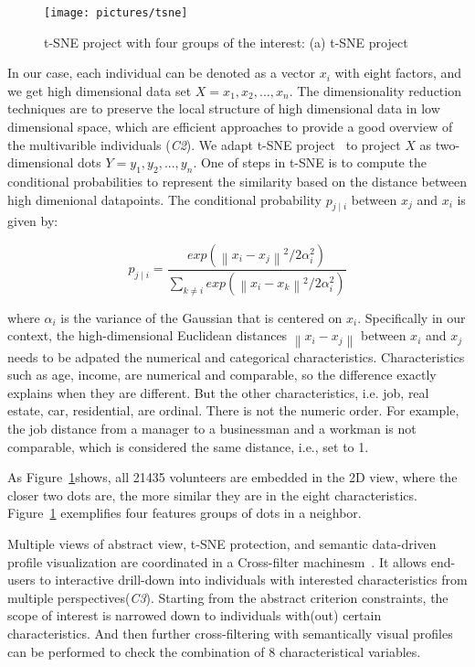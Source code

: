 \begin{figure}[htb!]
 \centering %
 \texttt{[image: pictures/tsne]}
 \caption{t-SNE project with four groups of the interest: (a) t-SNE project }
 \label{fig:tsne}
\end{figure}

In our case, each individual can be denoted as a vector $x_i$ with eight factors, and we get high dimensional data set $X={x_1, x_2, ..., x_n}$. The dimensionality reduction techniques are to preserve the local structure of high dimensional data in low dimensional space, which are efficient approaches to provide a good overview of the multivarible individuals (\textit{C2}). We adapt t-SNE project~\citep{maaten2008visualizing} to project $X$ as two-dimensional dots $Y={y_1, y_2, ..., y_n}$. One of steps in t-SNE is to compute the conditional probabilities to represent the similarity based on the distance between high dimenional datapoints. The conditional probability $p_{j\mid i}$ between $x_j$ and $x_i$ is given by:

\begin{equation}
p_{j\mid i} = \frac{exp({\left \| x_i - x_j \right \|}^2/2\alpha_i ^{2})}{\sum _{k\neq i}exp({\left \| x_i - x_k \right \|}^2/2\alpha_i ^{2})}
\end{equation}

where $\alpha_i$ is the variance of the Gaussian that is centered on $x_i$. Specifically in our context, the high-dimensional Euclidean distances $\left \| x_i - x_j \right \|$ between $x_i$ and $x_j$ needs to be adpated the numerical and categorical characteristics. Characteristics such as age, income, are numerical and comparable, so the difference exactly explains when they are different. But the other characteristics, i.e. job, real estate, car, residential, are ordinal. There is not the numeric order. For example, the job distance from a manager to a businessman and a workman is not comparable, which is considered the same distance, i.e., set to 1.


As Figure~\ref{fig:tsne}shows, all 21435 volunteers are embedded in the 2D view, where the closer two dots are, the more similar they are in the eight characteristics. Figure~\ref{fig:tsne} exemplifies four features groups of dots in a neighbor.

Multiple views of abstract view, t-SNE protection, and semantic data-driven profile visualization are coordinated in a Cross-filter machinesm~\citep{Weaver2010}. It allows end-users to interactive drill-down into individuals with interested characteristics from multiple perspectives(\textit{C3}). Starting from the abstract criterion constraints, the scope of interest is narrowed down to individuals with(out) certain characteristics. And then further cross-filtering with semantically visual profiles can be performed to check the combination of 8 characteristical variables.


